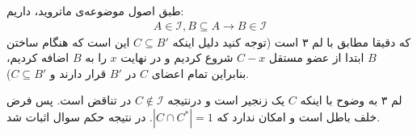 \documentclass[a4paper,12pt]{article}
\begin{document}
\proof{}
طبق اصول موضوعه‌ی ماتروید، داریم:
\begin{align*}
	A \in \mathcal{I} , B \subseteq A \rightarrow B \in \mathcal{I}
\end{align*}
که دقیقا مطابق با لم ۳ است (توجه کنید دلیل اینکه
$C \subseteq B'$
این است که هنگام ساختن $B$ ابتدا از عضو مستقل 
$C - x$
شروع کردیم و در نهایت $x$ را به $B$ اضافه کردیم، بنابراین تمام اعضای $C$ در $B'$ قرار دارند و $C \subseteq B'$).

لم ۳ به وضوح با اینکه $C$ یک زنجیر است و درنتیجه 
$C \notin \mathcal{I}$
 در تناقض است. پس فرض خلف باطل است و امکان ندارد که
$|C \cap C^*| = 1$.
در نتیجه حکم سوال اثبات شد. 
\end{document}
